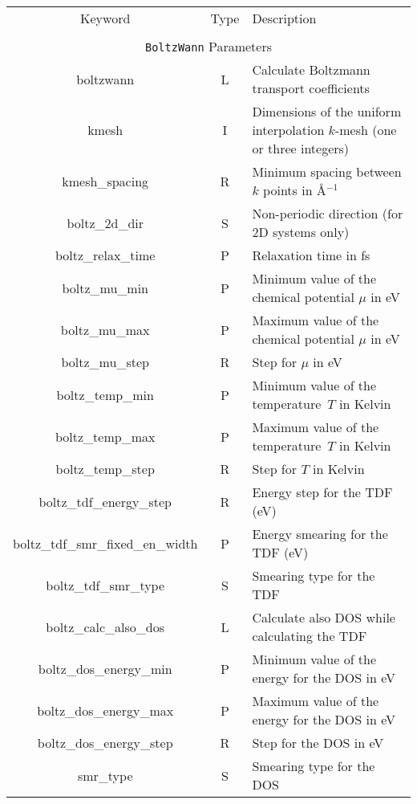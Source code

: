\begin{table}[hH!]
\begin{center}
\begin{tabular}{|c|c|p{6cm}|}
\hline
Keyword & Type & Description \\
        &      &             \\
\hline\hline
\multicolumn{3}{|c|}{{\tt BoltzWann} Parameters} \\
\hline
{\sc boltzwann}   & L & Calculate Boltzmann transport coefficients \\
{\sc [boltz\_]kmesh} & I & Dimensions of the uniform interpolation 
$k$-mesh (one or three integers)\\ 
{\sc [boltz\_]kmesh\_spacing} & R & Minimum spacing between $k$ points in \AA$^{-1}$\\
{\sc boltz\_2d\_dir} & S & Non-periodic direction (for 2D systems only)\\
{\sc boltz\_relax\_time} & P & Relaxation time in fs\\
{\sc boltz\_mu\_min} & P & Minimum value of the chemical potential $\mu$ in eV\\
{\sc boltz\_mu\_max} & P & Maximum value of the chemical potential $\mu$ in eV\\
{\sc boltz\_mu\_step} & R & Step for $\mu$ in eV\\
{\sc boltz\_temp\_min} & P & Minimum value of the temperature~$T$ in Kelvin \\
{\sc boltz\_temp\_max} & P & Maximum value of the temperature~$T$ in Kelvin \\
{\sc boltz\_temp\_step} & R & Step for $T$ in Kelvin \\
{\sc boltz\_tdf\_energy\_step} & R & Energy step for the TDF (eV) \\
{\sc boltz\_tdf\_smr\_fixed\_en\_width} & P & Energy smearing for the TDF (eV) \\
{\sc boltz\_tdf\_smr\_type} & S & Smearing type for the TDF \\
{\sc boltz\_calc\_also\_dos} & L & Calculate also DOS while calculating the TDF\\
{\sc boltz\_dos\_energy\_min} & P & Minimum value of the energy for the DOS in eV \\
{\sc boltz\_dos\_energy\_max} & P & Maximum value of the energy for the DOS in eV \\
{\sc boltz\_dos\_energy\_step} & R & Step for the DOS in eV\\
{smr\_type} & S & Smearing type for the DOS \\

\end{tabular}
\end{center}
\end{table}
